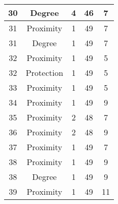 \documentclass[results.tex]{subfiles}
\begin{document}
\begin{center}
\begin{tabular}{| c || c | c | c | c |}
            \hline
            30                      & Degree                       & 4                      & 46                      & 7                    \\
            \hline
            31                      & Proximity                    & 1                      & 49                      & 7                    \\
            \hline
            31                      & Degree                       & 1                      & 49                      & 7                    \\
            \hline
            32                      & Proximity                    & 1                      & 49                      & 5                    \\
            \hline
            32                      & Protection                   & 1                      & 49                      & 5                    \\
            \hline
            33                      & Proximity                    & 1                      & 49                      & 5                    \\
            \hline
            34                      & Proximity                    & 1                      & 49                      & 9                    \\
            \hline
            35                      & Proximity                    & 2                      & 48                      & 7                    \\
            \hline
            36                      & Proximity                    & 2                      & 48                      & 9                    \\
            \hline
            37                      & Proximity                    & 1                      & 49                      & 7                    \\
            \hline
            38                      & Proximity                    & 1                      & 49                      & 9                    \\
            \hline
            38                      & Degree                       & 1                      & 49                      & 9                    \\
            \hline
            39                      & Proximity                    & 1                      & 49                      & 11                   \\

\end{tabular}
\end{center}
\end{document}

